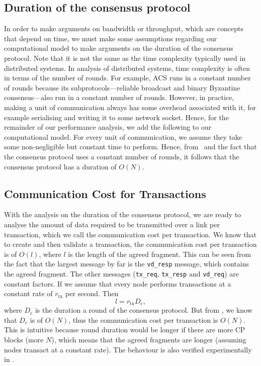 \subsection{Duration of the consensus protocol}
\label{sec:cons-duration}
In order to make arguments on bandwidth or throughput, which are concepts that depend on time,
we must make some assumptions regarding our computational model to make arguments on the duration of the consensus protocol.
Note that it is not the same as the time complexity typically used in distributed systems.
In analysis of distributed systems, time complexity is often in terms of the number of rounds.
For example, ACS runs in a constant number of rounds because its subprotocols---reliable broadcast and binary Byzantine consensus---also run in a constant number of rounds.
However, in practice, making a unit of communication always has some overhead associated with it, for example serialising and writing it to some network socket.
Hence, for the remainder of our performance analysis, we add the following to our computational model.
For every unit of communication, we assume they take some non-negligible but constant time to perform.
Hence, from~ and the fact that the consensus protocol uses a constant number of rounds,
it follows that the consensus protocol has a duration of $O(N)$.

\subsection{Communication Cost for Transactions}
\label{sec:communication-cost-for-tx}
With the analysis on the duration of the consensus protocol,
we are ready to analyse the amount of data required to be transmitted over a link per transaction,
which we call the communication cost per transaction.
We know that to create and then validate a transaction,
the communication cost per transaction is of $O(l)$,
where $l$ is the length of the agreed fragment.
This can be seen from the fact that the largest message by far is the \texttt{vd\_resp} message,
which contains the agreed fragment.
The other messages (\texttt{tx\_req}, \texttt{tx\_resp} and \texttt{vd\_req}) are constant factors.
If we assume that every node performs transactions at a constant rate of $r_{\text{tx}}$ per second.
Then
$$l = r_{\text{tx}} D_{\text{c}},$$
where $D_{\text{c}}$ is the duration a round of the consensus protocol.
But from ,
we know that $D_{\text{c}}$ is of $O(N)$, thus the communication cost per transaction is $O(N)$.
This is intuitive because round duration would be longer if there are more CP blocks (more $N$), which means that the agreed fragments are longer (assuming nodes transact at a constant rate).
The behaviour is also verified experimentally in .

